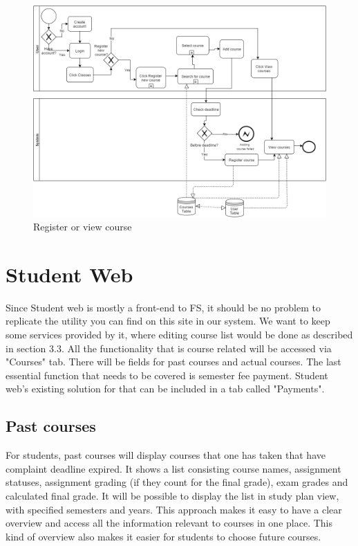 \begin{figure}[h]
\centering
\includegraphics[width=\linewidth]{register_view_courses.png}
\caption{Register or view course}
\label{fig:regview}
\end{figure}
\newpage

\section{Student Web}
Since Student web is mostly a front-end to FS, it should be no problem to replicate the utility you can find on this site in our system. We want to keep some services provided by it, where editing course list would be done as described in section 3.3. All the functionality that is course related will be accessed via "Courses" tab. There will be fields for past courses and actual courses. The last essential function that needs to be covered is semester fee payment. Student web's existing solution for that can be included in a tab called "Payments".

\subsection{Past courses}
For students, past courses will display courses that one has taken that have complaint deadline expired. It shows a list consisting course names, assignment statuses, assignment grading (if they count for the final grade), exam grades and calculated final grade. It will be possible to display the list in study plan view, with specified semesters and years. This approach makes it easy to have a clear overview and access all the information relevant to courses in one place. This kind of overview also makes it easier for students to choose future courses.
